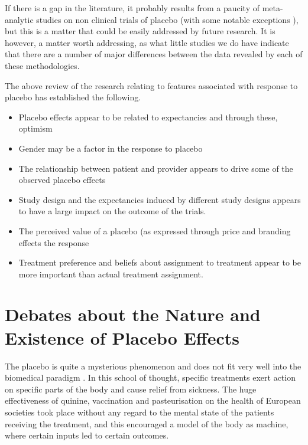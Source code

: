 If there is a gap in the literature, it probably results from a paucity of meta-analytic studies on non clinical trials of placebo (with some notable exceptions \cite{Wampol2007}\cite{Vase2002}), but this is a matter that could be easily addressed by future research. It is however, a matter worth addressing, as what little studies we do have indicate that there are a number of major differences between the data revealed by each of these methodologies. 

The above review of the  research relating to features associated with response to placebo has established the following. 
\begin{itemize}
\item Placebo effects appear to be related to expectancies and through these, optimism
\item Gender may be a factor in the response to placebo
\item The relationship between patient and provider appears to drive some of the observed placebo effects
\item Study design and the expectancies induced by different study designs appears to have a large impact on the outcome of the trials. 
\item The perceived value of a placebo (as expressed through price and branding effects the response
\item Treatment preference and beliefs about assignment to treatment appear to be more important than actual treatment assignment.
\end{itemize}


\section{Debates about the Nature and Existence of Placebo Effects}
\label{sec:nature-existence}

The placebo is quite a mysterious phenomenon and does not fit very well into the biomedical paradigm \cite{Kaptchuk1998} \cite{Caspi2002}. In this school of thought, specific treatments exert action on specific parts of the body and cause relief from sickness. The huge effectiveness of quinine, vaccination and pasteurisation on the health of European societies took place without any regard to the mental state of the patients receiving the treatment, and this encouraged a model of the body as machine, where certain inputs led to certain outcomes. 

